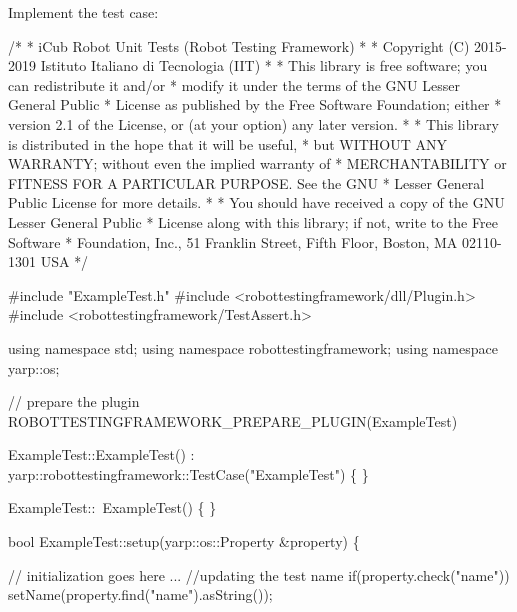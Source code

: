 Implement the test case\+:


\begin{DoxyCodeInclude}
\textcolor{comment}{/*}
\textcolor{comment}{ * iCub Robot Unit Tests (Robot Testing Framework)}
\textcolor{comment}{ *}
\textcolor{comment}{ * Copyright (C) 2015-2019 Istituto Italiano di Tecnologia (IIT)}
\textcolor{comment}{ *}
\textcolor{comment}{ * This library is free software; you can redistribute it and/or}
\textcolor{comment}{ * modify it under the terms of the GNU Lesser General Public}
\textcolor{comment}{ * License as published by the Free Software Foundation; either}
\textcolor{comment}{ * version 2.1 of the License, or (at your option) any later version.}
\textcolor{comment}{ *}
\textcolor{comment}{ * This library is distributed in the hope that it will be useful,}
\textcolor{comment}{ * but WITHOUT ANY WARRANTY; without even the implied warranty of}
\textcolor{comment}{ * MERCHANTABILITY or FITNESS FOR A PARTICULAR PURPOSE.  See the GNU}
\textcolor{comment}{ * Lesser General Public License for more details.}
\textcolor{comment}{ *}
\textcolor{comment}{ * You should have received a copy of the GNU Lesser General Public}
\textcolor{comment}{ * License along with this library; if not, write to the Free Software}
\textcolor{comment}{ * Foundation, Inc., 51 Franklin Street, Fifth Floor, Boston, MA  02110-1301  USA}
\textcolor{comment}{ */}

\textcolor{preprocessor}{#include "ExampleTest.h"}
\textcolor{preprocessor}{#include <robottestingframework/dll/Plugin.h>}
\textcolor{preprocessor}{#include <robottestingframework/TestAssert.h>}

\textcolor{keyword}{using namespace }std;
\textcolor{keyword}{using namespace }robottestingframework;
\textcolor{keyword}{using namespace }yarp::os;

\textcolor{comment}{// prepare the plugin}
ROBOTTESTINGFRAMEWORK\_PREPARE\_PLUGIN(ExampleTest)

ExampleTest::ExampleTest() : yarp::robottestingframework::TestCase(\textcolor{stringliteral}{"ExampleTest"}) \{
\}

ExampleTest::~ExampleTest() \{ \}

\textcolor{keywordtype}{bool} ExampleTest::setup(yarp::os::Property &property) \{

    \textcolor{comment}{// initialization goes here ...}
    \textcolor{comment}{//updating the test name}
    \textcolor{keywordflow}{if}(property.check(\textcolor{stringliteral}{"name"}))
        setName(property.find(\textcolor{stringliteral}{"name"}).asString());


\end{DoxyCodeInclude}
